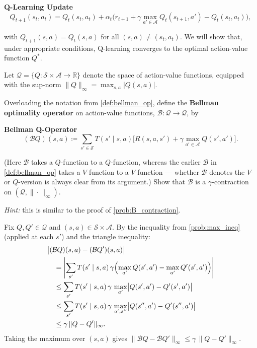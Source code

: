 \documentclass[11pt]{article}
\newcommand{\cS}{\mathcal{S}}
\newcommand{\cA}{\mathcal{A}}
\begin{document}
\begin{callout}[note]
\textbf{Q-Learning Update}
$$
Q_{t+1}(s_t, a_t) = Q_t(s_t, a_t) + \alpha_t\bigl(r_{t+1} + \gamma \max_{a' \in \cA} Q_t(s_{t+1}, a') - Q_t(s_t, a_t)\bigr),
$$
\end{callout}
with $Q_{t+1}(s,a) = Q_t(s,a)$ for all $(s,a) \neq (s_t, a_t)$.
We will show that, under appropriate conditions, Q-learning converges to the optimal action-value function $Q^*$.

Let $\mathcal{Q} = \{Q : \cS \times \cA \to \mathbb{R}\}$ denote the space of action-value functions, equipped with the sup-norm $\|Q\|_\infty = \max_{s,a} |Q(s,a)|$.

\begin{exercise}
\label{prob:BQ_contraction} Overloading the notation from \cref{def:bellman_op}, define the \textbf{Bellman optimality operator} on action-value functions, $\mathcal{B} : \mathcal{Q} \to \mathcal{Q}$, by
\begin{callout}[note]
\textbf{Bellman Q-Operator}
$$
(\mathcal{B}Q)(s,a) \coloneqq \sum_{s' \in \cS} T(s' \mid s, a)\bigl[R(s,a,s') + \gamma \max_{a' \in \cA} Q(s', a')\bigr].
$$
\end{callout}
(Here $\mathcal{B}$ takes a $Q$-function to a $Q$-function, whereas the earlier $\mathcal{B}$ in \cref{def:bellman_op} takes a $V$-function to a $V$-function --- whether $\mathcal{B}$ denotes the $V$- or $Q$-version is always clear from its argument.) Show that $\mathcal{B}$ is a $\gamma$-contraction on $(\mathcal{Q}, \|\cdot\|_\infty)$.

\textit{Hint:} this is similar to the proof of \cref{prob:B_contraction}.
\end{exercise}

\begin{solution}
Fix $Q, Q' \in \mathcal{Q}$ and $(s,a) \in \cS \times \cA$. By the inequality from \cref{prob:max_ineq} (applied at each $s'$) and the triangle inequality:
\begin{align*}
&\bigl|(\mathcal{B}Q)(s,a) - (\mathcal{B}Q')(s,a)\bigr| \\
&\quad= \left|\sum_{s'} T(s' \mid s,a)\,\gamma\Bigl(\max_{a'} Q(s',a') - \max_{a'} Q'(s',a')\Bigr)\right| \\
&\quad\le \sum_{s'} T(s' \mid s,a)\,\gamma\,\max_{a'}\bigl|Q(s',a') - Q'(s',a')\bigr| \\
&\quad\le \sum_{s'} T(s' \mid s,a)\,\gamma\,\max_{a', s''}\bigl|Q(s'',a') - Q'(s'',a')\bigr| \\
&\quad\le \gamma\,\|Q - Q'\|_\infty.
\end{align*}
Taking the maximum over $(s,a)$ gives $\|\mathcal{B}Q - \mathcal{B}Q'\|_\infty \le \gamma\,\|Q - Q'\|_\infty$.
\end{solution}
\end{document}
